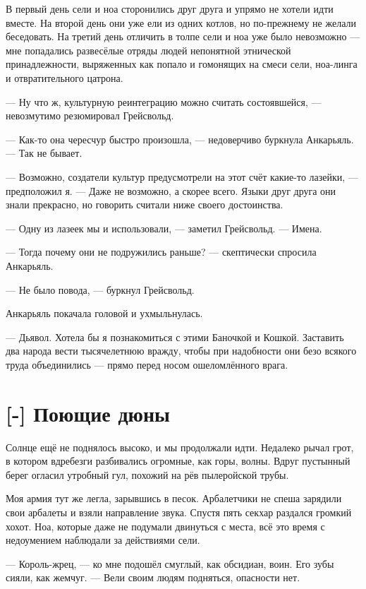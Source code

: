 \textspace

В первый день сели и ноа сторонились друг друга и упрямо не хотели идти вместе.
На второй день они уже ели из одних котлов, но по-прежнему не желали беседовать.
На третий день отличить в толпе сели и ноа уже было невозможно --- мне попадались развесёлые отряды людей непонятной этнической принадлежности, выряженных как попало и гомонящих на смеси сели, ноа-линга и отвратительного цатрона.

---  Ну что ж, культурную реинтеграцию можно считать состоявшейся, --- невозмутимо резюмировал Грейсвольд.

---  Как-то она чересчур быстро произошла, --- недоверчиво буркнула Анкарьяль.
--- Так не бывает.

--- Возможно, создатели культур предусмотрели на этот счёт какие-то лазейки, --- предположил я.
--- Даже не возможно, а скорее всего.
Языки друг друга они знали прекрасно, но говорить считали ниже своего достоинства.

--- Одну из лазеек мы и использовали, --- заметил Грейсвольд.
--- Имена.

--- Тогда почему они не подружились раньше? --- скептически спросила Анкарьяль.

--- Не было повода, --- буркнул Грейсвольд.

Анкарьяль покачала головой и ухмыльнулась.

--- Дьявол.
Хотела бы я познакомиться с этими Баночкой и Кошкой.
Заставить два народа вести тысячелетнюю вражду, чтобы при надобности они безо всякого труда объединились --- прямо перед носом ошеломлённого врага.

\section{[-] Поющие дюны}

Солнце ещё не поднялось высоко, и мы продолжали идти.
Недалеко рычал грот, в котором вдребезги разбивались огромные, как горы, волны.
Вдруг пустынный берег огласил утробный гул, похожий на рёв пылеройской трубы.

Моя армия тут же легла, зарывшись в песок.
Арбалетчики не спеша зарядили свои арбалеты и взяли направление звука.
Спустя пять секхар раздался громкий хохот.
Ноа, которые даже не подумали двинуться с места, всё это время с недоумением наблюдали за действиями сели.

--- Король-жрец, --- ко мне подошёл смуглый, как обсидиан, воин.
Его зубы сияли, как жемчуг.
--- Вели своим людям подняться, опасности нет.

